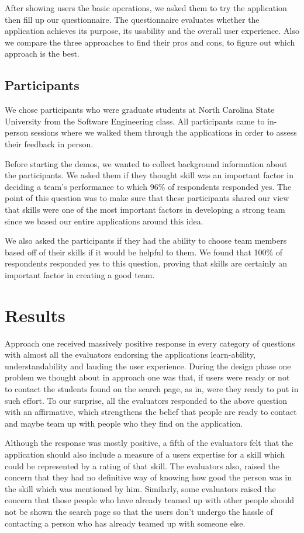 \documentclass[conference]{IEEEtran}
\begin{document}
After showing users the basic operations, we asked them to try the application then fill up our questionnaire. The questionnaire evaluates whether the application achieves its purpose, its usability and the overall user experience. Also we compare the three approaches to find their pros and cons, to figure out which approach is the best.

\subsection{Participants}
We chose participants who were graduate students at North Carolina State University from the Software Engineering class. All participants came to in-person sessions where we walked them through the applications in order to assess their feedback in person. 

Before starting the demos, we wanted to collect background information about the participants. We asked them if they thought skill was an important factor in deciding a team's performance to which 96\% of respondents responded yes. The point of this question was to make sure that these participants shared our view that skills were one of the most important factors in developing a strong team since we based our entire applications around this idea. 

We also asked the participants if they had the ability to choose team members based off of their skills if it would be helpful to them. We found that 100\% of respondents responded yes to this question, proving that skills are certainly an important factor in creating a good team. 


\section{Results}
Approach one received massively positive response in every category of questions with almost all the evaluators endorsing the applications learn-ability, understandability and lauding the user experience. During the design phase one problem we thought about in approach one was that, if users were ready or not to contact the students found on the search page, as in, were they ready to put in such effort. To our surprise, all the evaluators responded to the above question with an affirmative, which strengthens the belief that people are ready to contact and maybe team up with people who they find on the application. 

Although the response was mostly positive, a fifth of the evaluators felt that the application should also include a measure of a users expertise for a skill which could be represented by a rating of that skill. The evaluators also, raised the concern that they had no definitive way of knowing how good the person was in the skill which was mentioned by him. Similarly, some evaluators raised the concern that those people who have already teamed up with other people should not be shown the search page so that the users don't undergo the hassle of contacting a person who has already teamed up with someone else.
\end{document}
